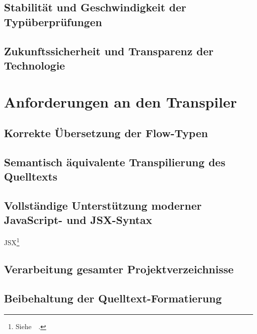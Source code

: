   \subsection{Stabilität und Geschwindigkeit der Typüberprüfungen}
  \subsection{Zukunftssicherheit und Transparenz der Technologie}

\section{Anforderungen an den Transpiler}

  \subsection{Korrekte Übersetzung der Flow-Typen}
  \label{subsection:requirement:correct-translation}

  \subsection{Semantisch äquivalente Transpilierung des Quelltexts}
  \label{subsection:requirement:semantic-equivalence}

  \subsection{Vollständige Unterstützung moderner JavaScript- und JSX-Syntax}
  \label{subsection:requirement:modern-js-support}

  JSX\footnote{Siehe~~\autocite{SOFTWARE:JSX}.}

  \subsection{Verarbeitung gesamter Projektverzeichnisse}
  \label{subsection:requirement:batch-processing}

  \subsection{Beibehaltung der Quelltext-Formatierung}
  \label{subsection:requirement:format}
